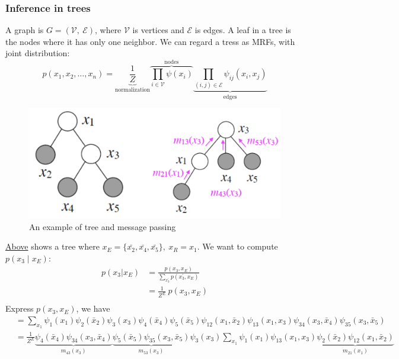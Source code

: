 \subsubsection*{Inference in trees}
A graph is $G=(\mathcal{V},\:\mathcal{E})$, where $\mathcal{V}$ is vertices and $\mathcal{E}$ is edges. A leaf in a tree is the nodes where it has only one neighbor. We can regard a tress as MRFs, with joint distribution:
$$p\left(x_1, x_2, \ldots, x_n\right)=\underbrace{\frac{1}{Z}}_{\text{normalization}}\overbrace{\prod_{i \in \mathcal{V}} \psi\left(x_i\right)}^{\text{nodes}}\underbrace{\prod_{(i, j) \in \mathcal{E}} \psi_{i j}\left(x_i, x_j\right)}_{\text{edges}}$$
\begin{example}
    \begin{figure}[H]
        \centering
        \includegraphics[width = .6\linewidth]{codes/figures/section4/figure_4_1.png}
        \caption{An example of tree and message passing}
        \label{fig:tree}
    \end{figure}
    \hyperref[fig:tree]{Above} shows a tree where $x_E=\{\bar{x_2},\bar{x_4},\bar{x_5}\},\:x_R=x_1$. We want to compute $p(x_3\mid x_E)$:
    \begin{align*}
        p(x_3|x_E)&=\frac{p\left(x_3, x_E\right)}{\sum_{x_3^{\prime}} p\left(x_3^{\prime}, x_E\right)}\\
        &=\frac{1}{Z^E}\:p(x_3,x_E)\\
    \end{align*}
    Express $p(x_3,x_E)$, we have
    \begin{align*}
        &=\sum_{x_1} \psi_1\left(x_1\right) \psi_2\left(\bar{x}_2\right) \psi_3\left(x_3\right) \psi_4\left(\bar{x}_4\right) \psi_5\left(\bar{x}_5\right) \psi_{12}\left(x_1, \bar{x}_2\right) \psi_{13}\left(x_1, x_3\right) \psi_{34}\left(x_3, \bar{x}_4\right) \psi_{35}\left(x_3, \bar{x}_5\right)\\
        &=\frac{1}{Z^E} \underbrace{\psi_4\left(\bar{x}_4\right) \psi_{34}\left(x_3, \bar{x}_4\right)}_{m_{43}\left(x_3\right)} \underbrace{\psi_5\left(\bar{x}_5\right) \psi_{35}\left(x_3, \bar{x}_5\right)}_{m_{53}\left(x_3\right)} \psi_3\left(x_3\right) \sum_{x_1} \psi_1\left(x_1\right) \psi_{13}\left(x_1, x_3\right) \underbrace{\psi_2\left(\bar{x}_2\right) \psi_{12}\left(x_1, \bar{x}_2\right)}_{m_{21}\left(x_1\right)} \\

\end{align*}
\end{example}
